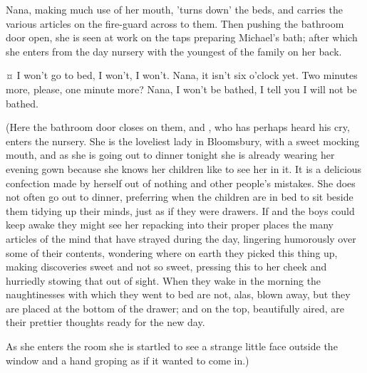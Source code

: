 \begin{stagedir}
Nana, making much use of her mouth, 'turns down' the beds,
and carries the various articles on the fire-guard across to them.
Then pushing the bathroom door open,
she is seen at work on the taps preparing Michael's bath;
after which she enters from the day nursery with the youngest of the family on her back.
\end{stagedir}

\begin{drama}

\michaelspeaks {}¤
I won't go to bed, I won't, I won't.
Nana, it isn't six o'clock yet.
Two minutes more, please, one minute more?
Nana, I won't be bathed, I tell you I will not be bathed.

\end{drama}

\begin{stagedir}
(Here the bathroom door closes on them, and \mrsdarling, who has perhaps heard his cry, enters the nursery.
She is the loveliest lady in Bloomsbury, with a sweet mocking mouth, and as she is going out to dinner tonight she is already wearing her evening gown because she knows her children like to see her in it.
It is a delicious confection made by herself out of nothing and other people's mistakes.
She does not often go out to dinner, preferring when the children are in bed to sit beside them tidying up their minds, just as if they were drawers.
If \wendy and the boys could keep awake they might see her repacking into their proper places the many articles of the mind that have strayed during the day, lingering humorously over some of their contents, wondering where on earth they picked this thing up, making discoveries sweet and not so sweet, pressing this to her cheek and hurriedly stowing that out of sight.
When they wake in the morning the naughtinesses with which they went to bed are not, alas, blown away, but they are placed at the bottom of the drawer; and on the top, beautifully aired, are their prettier thoughts ready for the new day.

As she enters the room she is startled to see a strange little face outside the window and a hand groping as if it wanted to come in.)
\end{stagedir}


